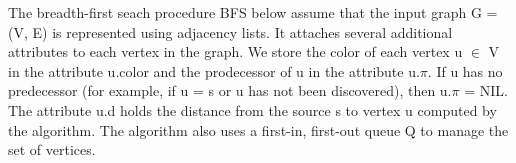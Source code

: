 \documentclass[preview]{standalone}
\begin{document}
\begin{center}
The breadth-first seach procedure BFS below assume that the input graph G = (V, E) is represented using adjacency lists. It attaches several additional attributes to each vertex in the graph. We store the color of each vertex u $\in$ V in the attribute u.color and the prodecessor of u in the attribute u.$\pi$. If u has no predecessor (for example, if u = s or u has not been discovered), then u.$\pi$ = NIL. The attribute u.d holds the distance from the source s to vertex u computed by the algorithm. The algorithm also uses a first-in, first-out queue Q to manage the set of vertices.
\end{center}
\end{document}
